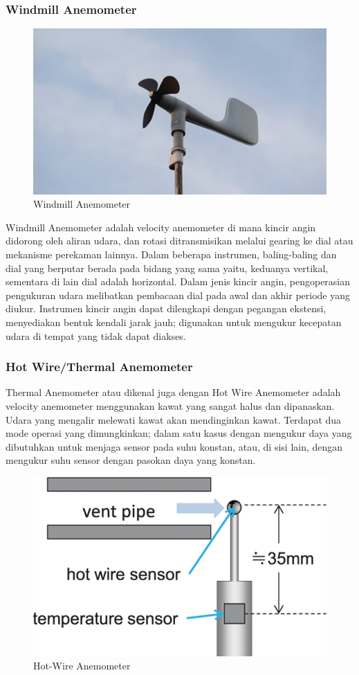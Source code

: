\subsubsection{Windmill Anemometer}

\begin{figure}[h!]
	\centering
	\includegraphics[width=0.5\linewidth]{gambar/anemometerWindmill}
	\caption{Windmill Anemometer}
	\label{fig:anemometerwindmill}
\end{figure}


Windmill Anemometer adalah velocity anemometer di mana kincir angin didorong oleh aliran udara, dan rotasi ditransmisikan melalui gearing ke dial atau 
mekanisme perekaman lainnya. Dalam beberapa instrumen, baling-baling dan dial yang berputar berada pada bidang yang sama yaitu, keduanya vertikal, 
sementara di lain dial adalah horizontal. Dalam jenis kincir angin, pengoperasian pengukuran udara melibatkan pembacaan dial pada awal dan akhir 
periode yang diukur. Instrumen kincir angin dapat dilengkapi dengan pegangan ekstensi, menyediakan bentuk kendali jarak jauh; digunakan untuk mengukur 
kecepatan udara di tempat yang tidak dapat diakses.

\subsubsection{Hot Wire/Thermal Anemometer}

Thermal Anemometer atau dikenal juga dengan Hot Wire Anemometer adalah velocity anemometer menggunakan kawat yang sangat halus dan dipanaskan. Udara yang mengalir
melewati kawat akan mendinginkan kawat. Terdapat dua mode operasi yang dimungkinkan; dalam satu kasus dengan
mengukur daya yang dibutuhkan untuk menjaga sensor pada suhu konstan, atau, di sisi
lain, dengan mengukur suhu sensor dengan pasokan daya yang konstan.

\begin{figure}[h!]
	\centering
	\includegraphics[width=0.4\linewidth]{gambar/anemometerHotWire}
	\caption{Hot-Wire Anemometer}
	\label{fig:anemometerhotwire}
\end{figure}


